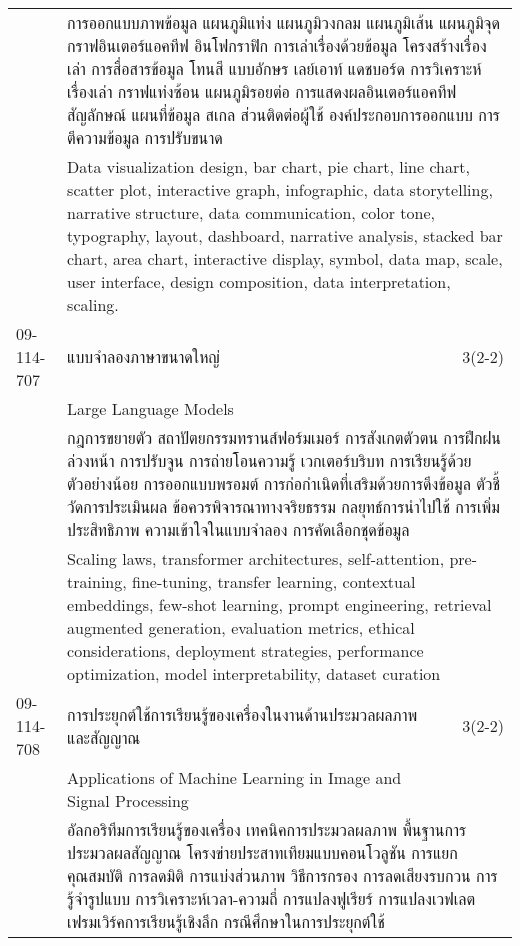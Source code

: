 \begin{longtable}{p{}p{}r{}}
&  \multicolumn{2}{p{0.75\textwidth}}{การออกแบบภาพข้อมูล แผนภูมิแท่ง แผนภูมิวงกลม แผนภูมิเส้น แผนภูมิจุด กราฟอินเตอร์แอคทีฟ อินโฟกราฟิก การเล่าเรื่องด้วยข้อมูล โครงสร้างเรื่องเล่า การสื่อสารข้อมูล โทนสี แบบอักษร เลย์เอาท์ แดชบอร์ด การวิเคราะห์เรื่องเล่า กราฟแท่งซ้อน แผนภูมิรอยต่อ การแสดงผลอินเตอร์แอคทีฟ สัญลักษณ์ แผนที่ข้อมูล สเกล ส่วนติดต่อผู้ใช้ องค์ประกอบการออกแบบ การตีความข้อมูล การปรับขนาด} \vspace{3mm} \\*
&  \multicolumn{2}{p{0.75\textwidth}}{Data visualization design, bar chart, pie chart, line chart, scatter plot, interactive graph, infographic, data storytelling, narrative structure, data communication, color tone, typography, layout, dashboard, narrative analysis, stacked bar chart, area chart, interactive display, symbol, data map, scale, user interface, design composition, data interpretation, scaling.} \vspace{8mm} \\*
09-114-707 & แบบจำลองภาษาขนาดใหญ่ & 3(2-2)\\*
 & Large Language Models & \phantom{x} \vspace{3mm} \\*
&  \multicolumn{2}{p{0.75\textwidth}}{กฎการขยายตัว สถาปัตยกรรมทรานส์ฟอร์มเมอร์ การสังเกตตัวตน การฝึกฝนล่วงหน้า การปรับจูน การถ่ายโอนความรู้ เวกเตอร์บริบท การเรียนรู้ด้วยตัวอย่างน้อย การออกแบบพรอมต์ การก่อกำเนิดที่เสริมด้วยการดึงข้อมูล  ตัวชี้วัดการประเมินผล ข้อควรพิจารณาทางจริยธรรม กลยุทธ์การนำไปใช้ การเพิ่มประสิทธิภาพ ความเข้าใจในแบบจำลอง การคัดเลือกชุดข้อมูล} \vspace{3mm} \\*
&  \multicolumn{2}{p{0.75\textwidth}}{Scaling laws, transformer architectures, self-attention, pre-training, fine-tuning, transfer learning, contextual embeddings, few-shot learning, prompt engineering, retrieval augmented generation, evaluation metrics, ethical considerations, deployment strategies, performance optimization, model interpretability, dataset curation} \vspace{8mm} \\*
09-114-708 & การประยุกต์ใช้การเรียนรู้ของเครื่องในงานด้านประมวลผลภาพและสัญญาณ & 3(2-2)\\*
 & Applications of Machine Learning in Image and Signal Processing & \phantom{x} \vspace{3mm} \\*
&  \multicolumn{2}{p{0.75\textwidth}}{อัลกอริทึมการเรียนรู้ของเครื่อง  เทคนิคการประมวลผลภาพ  พื้นฐานการประมวลผลสัญญาณ  โครงข่ายประสาทเทียมแบบคอนโวลูชัน  การแยกคุณสมบัติ  การลดมิติ  การแบ่งส่วนภาพ  วิธีการกรอง  การลดเสียงรบกวน  การรู้จำรูปแบบ  การวิเคราะห์เวลา-ความถี่  การแปลงฟูเรียร์  การแปลงเวฟเลต  เฟรมเวิร์คการเรียนรู้เชิงลึก  กรณีศึกษาในการประยุกต์ใช้} \vspace{3mm} \\*

\end{longtable}
